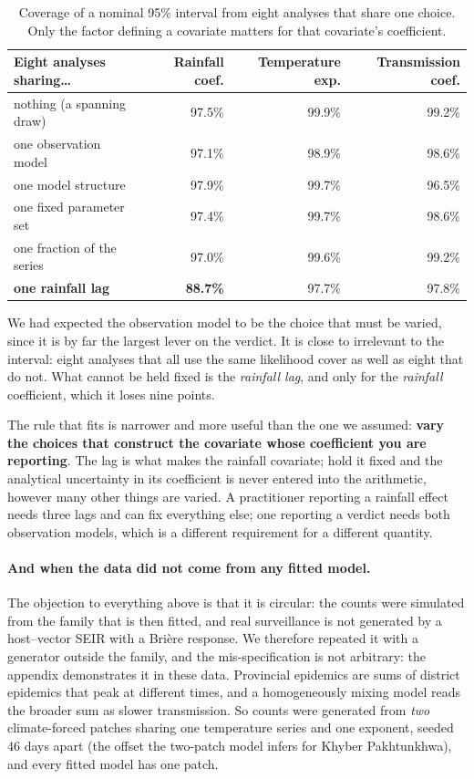 \documentclass[11pt,a4paper]{article}
\begin{document}
\begin{table}[htbp]
\centering
\caption{Coverage of a nominal 95\% interval from eight analyses that share one
choice. Only the factor defining a covariate matters for that covariate's
coefficient.}
\begin{tabular}{lrrr}
\toprule
Eight analyses sharing\ldots & Rainfall coef. & Temperature exp. & Transmission coef. \\
\midrule
nothing (a spanning draw) & 97.5\% & 99.9\% & 99.2\% \\
one observation model & 97.1\% & 98.9\% & 98.6\% \\
one model structure & 97.9\% & 99.7\% & 96.5\% \\
one fixed parameter set & 97.4\% & 99.7\% & 98.6\% \\
one fraction of the series & 97.0\% & 99.6\% & 99.2\% \\
\textbf{one rainfall lag} & \textbf{88.7\%} & 97.7\% & 97.8\% \\
\bottomrule
\end{tabular}
\end{table}

We had expected the observation model to be the choice that must be varied, since
it is by far the largest lever on the verdict. It is close to irrelevant to the
interval: eight analyses that all use the same likelihood cover as well as eight
that do not. What cannot be held fixed is the \emph{rainfall lag}, and only for
the \emph{rainfall} coefficient, which it loses nine points.

The rule that fits is narrower and more useful than the one we assumed:
\textbf{vary the choices that construct the covariate whose coefficient you are
reporting}. The lag is what makes the rainfall covariate; hold it fixed and the
analytical uncertainty in its coefficient is never entered into the arithmetic,
however many other things are varied. A practitioner reporting a rainfall effect
needs three lags and can fix everything else; one reporting a verdict needs both
observation models, which is a different requirement for a different quantity.

\paragraph{And when the data did not come from any fitted model.} The objection
to everything above is that it is circular: the counts were simulated from the
family that is then fitted, and real surveillance is not generated by a
host--vector SEIR with a Brière response. We therefore repeated it with a
generator outside the family, and the mis-specification is not arbitrary: the
appendix demonstrates it in these data. Provincial epidemics are sums of district
epidemics that peak at different times, and a homogeneously mixing model reads the
broader sum as slower transmission. So counts were generated from \emph{two}
climate-forced patches sharing one temperature series and one exponent, seeded 46
days apart (the offset the two-patch model infers for Khyber Pakhtunkhwa), and
every fitted model has one patch.
\end{document}
